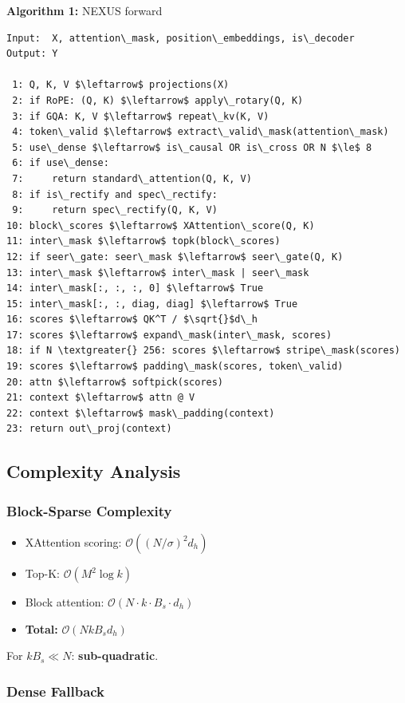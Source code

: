 \textbf{Algorithm 1:} NEXUS forward
\begin{lstlisting}
Input:  X, attention\_mask, position\_embeddings, is\_decoder
Output: Y

 1: Q, K, V $\leftarrow$ projections(X)
 2: if RoPE: (Q, K) $\leftarrow$ apply\_rotary(Q, K)
 3: if GQA: K, V $\leftarrow$ repeat\_kv(K, V)
 4: token\_valid $\leftarrow$ extract\_valid\_mask(attention\_mask)
 5: use\_dense $\leftarrow$ is\_causal OR is\_cross OR N $\le$ 8
 6: if use\_dense:
 7:     return standard\_attention(Q, K, V)
 8: if is\_rectify and spec\_rectify:
 9:     return spec\_rectify(Q, K, V)
10: block\_scores $\leftarrow$ XAttention\_score(Q, K)
11: inter\_mask $\leftarrow$ topk(block\_scores)
12: if seer\_gate: seer\_mask $\leftarrow$ seer\_gate(Q, K)
13: inter\_mask $\leftarrow$ inter\_mask | seer\_mask
14: inter\_mask[:, :, :, 0] $\leftarrow$ True
15: inter\_mask[:, :, diag, diag] $\leftarrow$ True
16: scores $\leftarrow$ QK^T / $\sqrt{}$d\_h
17: scores $\leftarrow$ expand\_mask(inter\_mask, scores)
18: if N \textgreater{} 256: scores $\leftarrow$ stripe\_mask(scores)
19: scores $\leftarrow$ padding\_mask(scores, token\_valid)
20: attn $\leftarrow$ softpick(scores)
21: context $\leftarrow$ attn @ V
22: context $\leftarrow$ mask\_padding(context)
23: return out\_proj(context)
\end{lstlisting}

\subsection{Complexity Analysis}

\subsubsection{Block-Sparse Complexity}

\begin{itemize}
\item XAttention scoring: $\mathcal{O}((N/\sigma)^2 d_h)$
\item Top-K: $\mathcal{O}(M^2 \log k)$
\item Block attention: $\mathcal{O}(N \cdot k \cdot B_s \cdot d_h)$
\item \textbf{Total:} $\mathcal{O}(N k B_s d_h)$

\end{itemize}
For $k B_s \ll N$: \textbf{sub-quadratic}.

\subsubsection{Dense Fallback}

